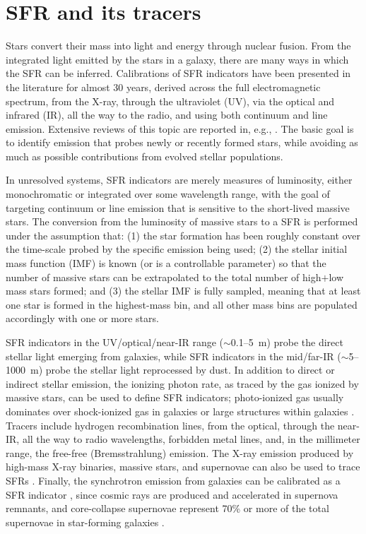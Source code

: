 \section{SFR and its tracers}%

Stars convert their mass into light and energy through nuclear fusion. From the integrated light emitted by the stars in a galaxy, there are many ways in which the SFR can be inferred. Calibrations of SFR indicators have been presented in the literature for almost 30 years, derived across the full electromagnetic spectrum, from the X-ray, through the ultraviolet (UV), via the optical and infrared (IR), all the way to the radio, and using both continuum and line emission. Extensive reviews of this topic are reported in, e.g., \citet{1998ARA&A..36..189K,2012ARA&A..50..531K,2012MNRAS.420.2190V}. The basic goal is to identify emission that probes newly or recently formed stars, while avoiding as much as possible contributions from evolved stellar populations.

In unresolved systems, SFR indicators are merely measures of luminosity, either monochromatic or integrated over some wavelength range, with the goal of targeting continuum or line emission that is sensitive to the short-lived massive stars. The conversion from the luminosity of massive stars to a SFR is performed under the assumption that: (1) the star formation has been roughly constant over the time-scale probed by the specific emission being used; (2) the stellar initial mass function (IMF) is known (or is a controllable parameter) so that the number of massive stars can be extrapolated to the total number of high$+$low mass stars formed; and (3) the stellar IMF is fully sampled, meaning that at least one star is formed in the highest-mass bin, and all other mass bins are populated accordingly with one or more stars.

SFR indicators in the UV/optical/near-IR range ($\sim$0.1--5~\textmu m) probe the direct stellar light emerging from galaxies, while SFR indicators in the mid/far-IR ($\sim$5--1000~\textmu m) probe the stellar light reprocessed by dust. In addition to direct or indirect stellar emission, the ionizing photon rate, as traced by the gas ionized by massive stars, can be used to define SFR indicators; photo-ionized gas usually dominates over shock-ionized gas in galaxies or large structures within galaxies \citep[e.g.,][]{2004AJ....127.1405C,2011ApJ...731...45H}. Tracers include hydrogen recombination lines, from the optical, through the near-IR, all the way to radio wavelengths, forbidden metal lines, and, in the millimeter range, the free-free (Bremsstrahlung) emission. The X-ray emission produced by high-mass X-ray binaries, massive stars, and supernovae can also be used to trace SFRs \citep{2017MNRAS.465.3390A}. Finally, the synchrotron emission from galaxies can be calibrated as a SFR indicator \citep{1992ARA&A..30..575C}, since cosmic rays are produced and accelerated in supernova remnants, and core-collapse supernovae represent 70\% or more of the total supernovae in star-forming galaxies \citep{2009A&A...503..137B}.

